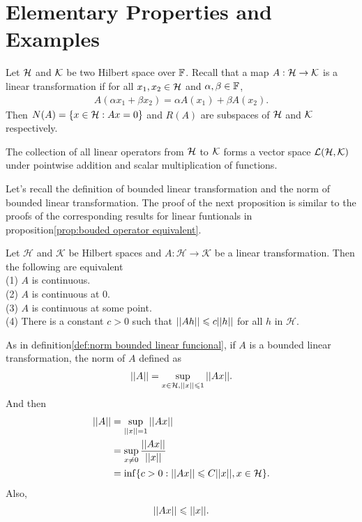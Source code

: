 \chapter{Elementary Properties and Examples}\label{chp:2_1}


Let $\mathcal{H}$ and $\mathcal{K}$ be two Hilbert space over $\mathbb{F}$. Recall that a map $A:\mathcal{H}\rightarrow \mathcal{K}$ is a linear transformation if for all $x_1,x_2\in \mathcal{H}$ and $\alpha,\beta\in \mathbb{F}$,
\begin{align*}
    A(\alpha x_1+\beta x_2) = \alpha A(x_1)+\beta A(x_2).
\end{align*}
Then $N(A)=\{x\in\mathcal{H}: Ax=0\}$ and $R(A)$ are subspaces of $\mathcal{H}$ and $\mathcal{K}$ respectively. 

The collection of all linear operators from $\mathcal{H}$ to $\mathcal{K}$ forms a vector space $\mathcal{L}(\mathcal{H}, \mathcal{K})$ under pointwise
addition and scalar multiplication of functions.

Let's recall the definition of bounded linear transformation and the norm of bounded linear transformation. The proof of the next proposition is similar to the proofs of the corresponding results for linear funtionals in proposition\ref{prop:bouded operator equivalent}. 

\begin{proposition}{}{}
    Let $\mathscr{H}$ and $\mathcal{K}$ be Hilbert spaces and $A:\mathscr{H}\rightarrow \mathcal{K}$ be a linear transformation. Then the following are equivalent\\
    (1) $A$ is continuous.\\
    (2) $A$ is continuous at $0$.\\
    (3) $A$ is continuous at some point.\\
    (4) There is a constant $c > 0$ such that $||Ah|| \leqslant c||h||$ for all $h$ in $\mathscr{H}$.
\end{proposition}



As in definition\ref{def:norm bounded linear funcional}, if $A$ is a bounded linear transformation, the norm of $A$ defined as
\begin{align*}
    ||A||=\sup_{x\in \mathcal{H},||x||\leqslant 1}||Ax||.
\end{align*}
And then
\begin{align*}
    ||A||&=\sup_{||x||=1}||Ax||\\
        &= \sup_{x\neq 0} \frac{||Ax||}{||x||}\\
        &= \inf\{c>0:||Ax||\leqslant C||x||,x\in \mathcal{H}\}.
\end{align*}
Also, 
\begin{align*}
    ||Ax||\leqslant ||x||. 
\end{align*}

